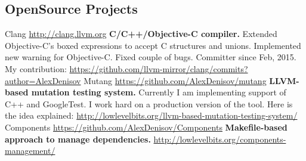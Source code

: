 \documentclass[11pt,a4paper]{moderncv}
\begin{document}
  \subsection{OpenSource Projects}
  \cvline
    {Clang}
    {\url{http://clang.llvm.org}\newline{}
    \textbf{C/C++/Objective-C compiler.}\newline{}
    Extended Objective-C's boxed expressions to accept C structures and unions.\newline{}
    Implemented new warning for Objective-C.\newline{}
    Fixed couple of bugs.\newline{}
    Committer since Feb, 2015.\newline{}
    My contribution:\newline{}
    \url{https://github.com/llvm-mirror/clang/commits?author=AlexDenisov}
    }
  \cvline
    {Mutang}
    {\url{https://github.com/AlexDenisov/mutang}\newline{}
    \textbf{LLVM-based mutation testing system.}\newline{}
    Currently I am implementing support of C++ and GoogleTest.\newline{}
    I work hard on a production version of the tool.\newline{}
    Here is the idea explained:\newline{}
    \url{http://lowlevelbits.org/llvm-based-mutation-testing-system/}
    }
  \cvline
    {Components}
    {\url{https://github.com/AlexDenisov/Components}\newline{}
    \textbf{Makefile-based approach to manage dependencies.}\newline{}
    \url{http://lowlevelbits.org/components-management/}
    }
\pagebreak
\end{document}

